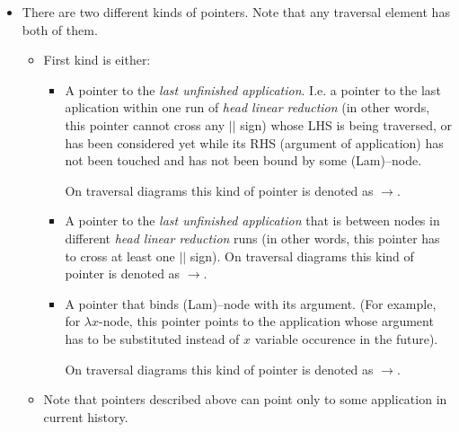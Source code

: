 \documentclass[a4paper, 10pt]{article}
\begin{document}
\begin{itemize}
\item There are two different kinds of pointers. Note that any traversal element has both of them.
  \begin{itemize}
  \item First kind is either:
    \begin{itemize}
    \item A pointer to the \textit{last unfinished application}. I.e. a pointer to the last aplication within one run of \textit{head linear reduction} 
      {\color{red} (in other words, this pointer cannot cross any {\color{blue}$||$} sign) whose LHS is being traversed, or has been considered yet while its RHS (argument of application) has not been touched and has not been bound by some (Lam)--node.}

      On traversal diagrams this kind of pointer is denoted as {\color{brown}$\rightarrow$}.
    \item A pointer to the \textit{last unfinished application} that is between nodes in different \textit{head linear reduction} runs (in other
      words, this pointer has to cross at least one {\color{blue}$||$} sign).
      On traversal diagrams this kind of pointer is denoted as {\color{red}$\rightarrow$}.
    \item A pointer that binds (Lam)--node with its argument. 
{\color{red} (For example, for $\lambda x$-node, this pointer points to the application whose argument has to be substituted instead of $x$ variable occurence in the future).} %

      On traversal diagrams this kind of pointer is denoted as {\color{violet}$\rightarrow$}.
    \end{itemize}
  \item Note that pointers described above can point only to some application in current history.


\end{itemize}
\end{itemize}
\end{document}
